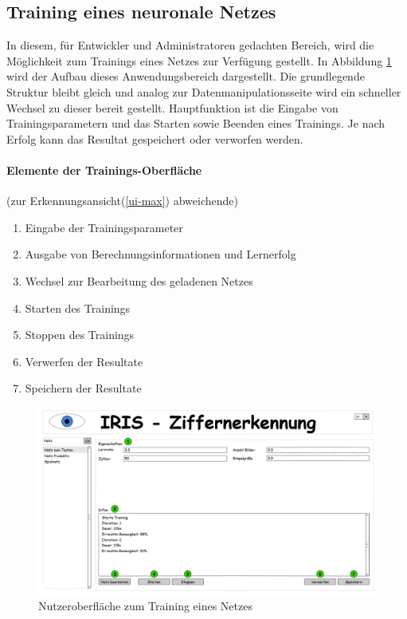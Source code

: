 \subsection{Training eines neuronale Netzes}
In diesem, für Entwickler und Administratoren gedachten Bereich, wird die Möglichkeit zum Trainings eines Netzes zur Verfügung gestellt. In Abbildung \ref{ui-train} wird der Aufbau dieses Anwendungsbereich dargestellt. Die grundlegende Struktur bleibt gleich und analog zur Datenmanipulationsseite wird ein schneller Wechsel zu dieser bereit gestellt. Hauptfunktion ist die Eingabe von Trainingsparametern und das Starten sowie Beenden eines Trainings. Je nach Erfolg kann das Resultat gespeichert oder verworfen werden.

\paragraph{Elemente der Trainings-Oberfläche} (zur Erkennungsansicht(\ref{ui-max}) abweichende)
\begin{enumerate}
\item Eingabe der Trainingsparameter
\item Ausgabe von Berechnungsinformationen und Lernerfolg
\item Wechsel zur Bearbeitung des geladenen Netzes
\item Starten des Trainings
\item Stoppen des Trainings
\item Verwerfen der Resultate
\item Speichern der Resultate
\end{enumerate}

\begin{figure}[H]
	\centering
	\includegraphics[width=1\textwidth]{Abbildungen/UI-Mocks/Train-Ui.png}
	\caption{Nutzeroberfläche zum Training eines Netzes}
	\label{ui-train}
\end{figure}
